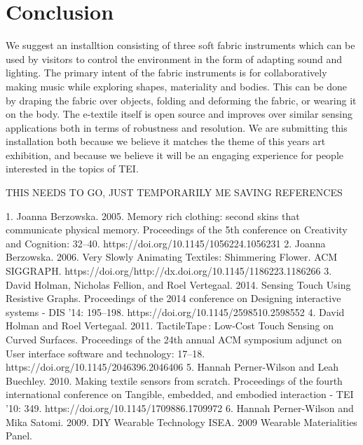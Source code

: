 \documentclass{sigchi-ext}
\begin{document}
\section{Conclusion}
We suggest an installtion consisting of three soft fabric instruments which can be used by visitors to control the environment in the form of adapting sound and lighting. The primary intent of the fabric instruments is for collaboratively making music while exploring shapes, materiality and bodies. This can be done by draping the fabric over objects, folding and deforming the fabric, or wearing it on the body. The e-textile itself is open source and improves over similar sensing applications both in terms of robustness and resolution. We are submitting this installation both because we believe it matches the theme of this years art exhibition, and because we believe it will be an engaging experience for people interested in the topics of TEI.



THIS NEEDS TO GO, JUST TEMPORARILY ME SAVING REFERENCES

1.	Joanna Berzowska. 2005. Memory rich clothing: second skins that communicate physical memory. Proceedings of the 5th conference on Creativity and Cognition: 32–40. https://doi.org/10.1145/1056224.1056231
2.	Joanna Berzowska. 2006. Very Slowly Animating Textiles: Shimmering Flower. ACM SIGGRAPH. https://doi.org/http://dx.doi.org/10.1145/1186223.1186266
3.	David Holman, Nicholas Fellion, and Roel Vertegaal. 2014. Sensing Touch Using Resistive Graphs. Proceedings of the 2014 conference on Designing interactive systems - DIS ’14: 195–198. https://doi.org/10.1145/2598510.2598552
4.	David Holman and Roel Vertegaal. 2011. TactileTape : Low-Cost Touch Sensing on Curved Surfaces. Proceedings of the 24th annual ACM symposium adjunct on User interface software and technology: 17–18. https://doi.org/10.1145/2046396.2046406
5.	Hannah Perner-Wilson and Leah Buechley. 2010. Making textile sensors from scratch. Proceedings of the fourth international conference on Tangible, embedded, and embodied interaction - TEI ’10: 349. https://doi.org/10.1145/1709886.1709972
6.	Hannah Perner-Wilson and Mika Satomi. 2009. DIY Wearable Technology ISEA. 2009 Wearable Materialities Panel.






\end{document}
